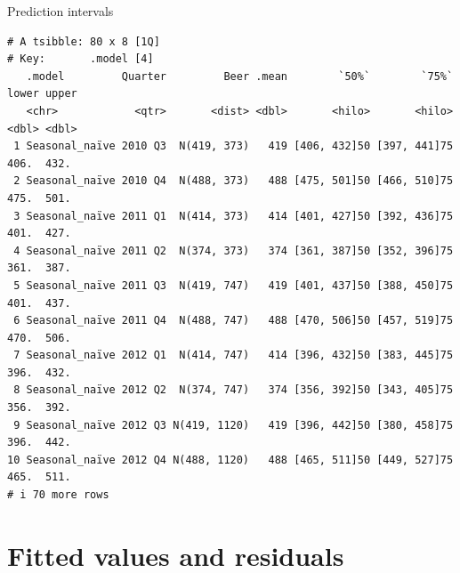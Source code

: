 \documentclass[
  14pt,
  ignorenonframetext,
  aspectratio=169,
]{beamer}
\newenvironment{Shaded}{\begin{snugshade}}{\end{snugshade}}
\newcommand{\AttributeTok}[1]{\textcolor[rgb]{0.77,0.63,0.00}{#1}}
\newcommand{\DecValTok}[1]{\textcolor[rgb]{0.00,0.00,0.81}{#1}}
\newcommand{\FunctionTok}[1]{\textcolor[rgb]{0.00,0.00,0.00}{#1}}
\newcommand{\NormalTok}[1]{\textcolor[rgb]{0.00,0.00,0.00}{#1}}
\newcommand{\SpecialCharTok}[1]{\textcolor[rgb]{0.00,0.00,0.00}{#1}}
\newcommand{\StringTok}[1]{\textcolor[rgb]{0.31,0.60,0.02}{#1}}
\renewenvironment{Shaded}{\vspace*{0.15cm}\color{black}\fontsize{10}{10}\sf\begin{snugshade}\color{black}}{\end{snugshade}}
\begin{document}
\begin{frame}[fragile]{Prediction intervals}
\protect\hypertarget{prediction-intervals-3}{}
\fontsize{10}{12}\sf

\begin{Shaded}
\end{Shaded}

\begin{verbatim}
# A tsibble: 80 x 8 [1Q]
# Key:       .model [4]
   .model         Quarter         Beer .mean        `50%`        `75%` lower upper
   <chr>            <qtr>       <dist> <dbl>       <hilo>       <hilo> <dbl> <dbl>
 1 Seasonal_naïve 2010 Q3  N(419, 373)   419 [406, 432]50 [397, 441]75  406.  432.
 2 Seasonal_naïve 2010 Q4  N(488, 373)   488 [475, 501]50 [466, 510]75  475.  501.
 3 Seasonal_naïve 2011 Q1  N(414, 373)   414 [401, 427]50 [392, 436]75  401.  427.
 4 Seasonal_naïve 2011 Q2  N(374, 373)   374 [361, 387]50 [352, 396]75  361.  387.
 5 Seasonal_naïve 2011 Q3  N(419, 747)   419 [401, 437]50 [388, 450]75  401.  437.
 6 Seasonal_naïve 2011 Q4  N(488, 747)   488 [470, 506]50 [457, 519]75  470.  506.
 7 Seasonal_naïve 2012 Q1  N(414, 747)   414 [396, 432]50 [383, 445]75  396.  432.
 8 Seasonal_naïve 2012 Q2  N(374, 747)   374 [356, 392]50 [343, 405]75  356.  392.
 9 Seasonal_naïve 2012 Q3 N(419, 1120)   419 [396, 442]50 [380, 458]75  396.  442.
10 Seasonal_naïve 2012 Q4 N(488, 1120)   488 [465, 511]50 [449, 527]75  465.  511.
# i 70 more rows
\end{verbatim}
\end{frame}

\hypertarget{fitted-values-and-residuals}{%
\section{Fitted values and
residuals}\label{fitted-values-and-residuals}}
\end{document}

